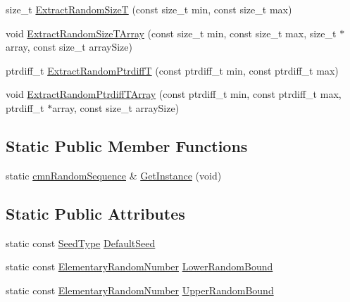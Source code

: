 {\bf }\par
\begin{DoxyCompactItemize}
\item 
size\+\_\+t \hyperlink{classcmn_random_sequence_aa6ae8a700426d8a9e54397606869cfd1}{Extract\+Random\+Size\+T} (const size\+\_\+t min, const size\+\_\+t max)
\item 
void \hyperlink{classcmn_random_sequence_a0df72fb25b3bcaa2c29ebe278a514e5c}{Extract\+Random\+Size\+T\+Array} (const size\+\_\+t min, const size\+\_\+t max, size\+\_\+t $\ast$array, const size\+\_\+t array\+Size)
\item 
ptrdiff\+\_\+t \hyperlink{classcmn_random_sequence_adaeaead34d142d5647cc2e30a42478f4}{Extract\+Random\+Ptrdiff\+T} (const ptrdiff\+\_\+t min, const ptrdiff\+\_\+t max)
\item 
void \hyperlink{classcmn_random_sequence_ae0c9403c678ab3708fe5b8eddb0bd423}{Extract\+Random\+Ptrdiff\+T\+Array} (const ptrdiff\+\_\+t min, const ptrdiff\+\_\+t max, ptrdiff\+\_\+t $\ast$array, const size\+\_\+t array\+Size)
\end{DoxyCompactItemize}

\subsection*{Static Public Member Functions}
\begin{DoxyCompactItemize}
\item 
static \hyperlink{classcmn_random_sequence}{cmn\+Random\+Sequence} \& \hyperlink{classcmn_random_sequence_a04c1fb832acf6755cb954b4582ec6419}{Get\+Instance} (void)
\end{DoxyCompactItemize}
\subsection*{Static Public Attributes}
\begin{DoxyCompactItemize}
\item 
static const \hyperlink{classcmn_random_sequence_a7b97009536ce38559fa5fb86a9eea16d}{Seed\+Type} \hyperlink{classcmn_random_sequence_aa189e86aad2a764fa2faa67732c1b168}{Default\+Seed}
\item 
static const \hyperlink{classcmn_random_sequence_a4728645d25009df6b70fd0db6340f92f}{Elementary\+Random\+Number} \hyperlink{classcmn_random_sequence_a3b9788523fe79f42e53a0331355cd73e}{Lower\+Random\+Bound}
\item 
static const \hyperlink{classcmn_random_sequence_a4728645d25009df6b70fd0db6340f92f}{Elementary\+Random\+Number} \hyperlink{classcmn_random_sequence_a42566669e8703c6846ce41e286f62e67}{Upper\+Random\+Bound}
\end{DoxyCompactItemize}
